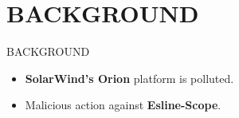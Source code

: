 \section{BACKGROUND}
\begin{frame}{BACKGROUND}
  \begin{itemize}
    \item \textbf{SolarWind's Orion} platform is polluted.
    \item Malicious action against \textbf{Esline-Scope}.
  \end{itemize}
\end{frame}